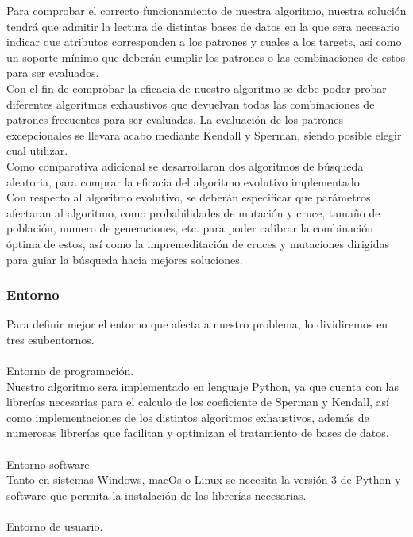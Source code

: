 \documentclass[a4paper,12pt,twoside,final]{book}
\begin{document}
Para comprobar el correcto funcionamiento de nuestra algoritmo, nuestra solución tendrá que admitir la lectura de distintas bases de datos en la que sera necesario indicar que atributos corresponden a los patrones y cuales a los targets, así como un soporte mínimo que deberán cumplir los patrones o las combinaciones de estos para ser evaluados.\\

Con el fin de comprobar la eficacia de nuestro algoritmo se debe poder probar diferentes algoritmos exhaustivos que devuelvan todas las combinaciones de patrones frecuentes para ser evaluadas. La evaluación de los patrones excepcionales se llevara acabo mediante Kendall y Sperman, siendo posible elegir cual utilizar.\\

Como comparativa adicional se desarrollaran dos algoritmos de búsqueda aleatoria, para comprar la eficacia del algoritmo evolutivo implementado.\\

Con respecto al algoritmo evolutivo, se deberán especificar que parámetros afectaran al algoritmo, como probabilidades de mutación y cruce, tamaño de población, numero de generaciones, etc. para poder calibrar la combinación óptima de estos, así como la impremeditación de cruces y mutaciones dirigidas para guiar la búsqueda hacia mejores soluciones.

\subsubsection{Entorno}

Para definir mejor el entorno que afecta a nuestro problema, lo dividiremos en tres esubentornos.\\
\\
Entorno de programación.\\

Nuestro algoritmo sera implementado en lenguaje Python, ya que cuenta con las librerías necesarias para el calculo de los coeficiente de Sperman y Kendall, así como implementaciones de los distintos algoritmos exhaustivos, además de numerosas librerías que facilitan y optimizan el tratamiento de bases de datos.\\
\\
Entorno software.\\

Tanto en sistemas Windows, macOs o Linux se necesita la versión 3 de Python y software que permita la instalación de las librerías necesarias. \\
\\
Entorno de usuario.\\
\end{document}
